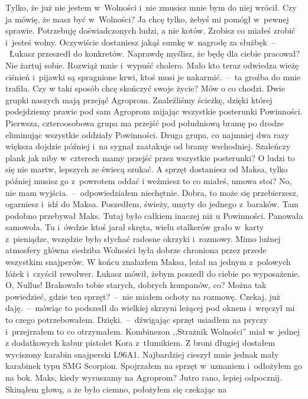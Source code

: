 \documentclass[../MAIN.tex]{subfiles}
\begin{document}
\xx Tylko, że już nie jestem w~Wolności i~nie zmusisz mnie bym
do
niej wrócił.
\xx Czy ja mówię, że masz być w~Wolności? Ja chcę tylko, żebyś
mi
pomógł w~pewnej sprawie. Potrzebuję doświadczonych ludzi, a nie
kotów. Zrobisz co miałeś zrobić i~jesteś wolny. Oczywiście
dostaniesz jakąś sumkę w~nagrodę za służbę\3k~--~Łukasz
przeszedł
do konkretów.
\xx Naprawdę myślisz, że będę dla ciebie pracował? Nie żartuj
sobie. Rozwiąż mnie i~wypuść cholero.
\xx Mało kto teraz odwiedza wieżę ciśnień i~pijawki są
spragnione
krwi, ktoś musi je nakarmić.~--~ta groźba do mnie trafiła. Czy
w
taki sposób chcę skończyć swoje życie?
\xx Mów o co chodzi.
\xx Dwie grupki naszych mają przejąć Agroprom. Znaleźliśmy
ścieżkę, dzięki której podejdziemy prawie pod sam Agroprom
mijając wszystkie posterunki Powinności. Pierwsza,
czteroosobowa grupa ma przejść pod południową bramę po drodze
eliminując wszystkie oddziały Powinności. Druga grupa, co
najmniej dwa razy większa dojdzie później i~na sygnał zaatakuje
od bramy wschodniej.
\xx Szaleńczy plan\3k jak niby w~czterech mamy przejść przez
wszystkie posterunki?
\xx O ludzi to się nie martw, lepszych ze świecą szukać. A
sprzęt
dostaniesz od Maksa, tylko później musisz go z~powrotem oddać i
weźmiesz to co miałeś, umowa stoi?
\xx No, nie mam wyjścia.~--~odpowiedziałem niechętnie.
\xx Dobra, to może się przebierzesz, ogarniesz i~idź do Maksa.
\qd
Poszedłem, świeży, umyty do jednego z~baraków. Tam podobno
przebywał Maks. Tutaj było całkiem inaczej niż u Powinności.
Panowała samowola. Tu i~ówdzie ktoś jarał skręta, wielu
stalkerów grało w~karty z~pieniądze, wszędzie było słychać
radosne okrzyki i~rozmowy. Mimo luźnej atmosfery główna
siedziba Wolności była dobrze chroniona przez przede wszystkim
snajperów. W końcu znalazłem Maksa, leżał na jednym z~polowych
łóżek i~czyścił rewolwer.
\sd
\xx Łukasz mówił, żebym poszedł do ciebie po wyposażenie.
\xx O, Nullus! Brakowało tobie starych, dobrych kompanów, co?
\xx Można tak powiedzieć, gdzie ten sprzęt?~--~nie miałem
ochoty na
rozmowę.
\xx Czekaj, już daję.~--~mówiąc to podszedł do wielkiej skrzyni
leżącej pod oknem i~wręczył mi to czego potrzebowałem.
\xx Dzięki.~--~dźwigając sprzęt usiadłem na pryczy
i~przejrzałem to
co otrzymałem. Kombinezon ,,Strażnik Wolności'' miał w~jednej z
dodatkowych kabur pistolet Kora z~tłumikiem. Z broni długiej
dostałem wyciszony karabin snajperski L96A1. Najbardziej
cieszył mnie jednak mały karabinek typu SMG Scorpion.
Spojrzałem na sprzęt w~uznaniem i~odłożyłem go na bok.
\xx Maks, kiedy wyruszamy na Agroprom?
\xx Jutro rano, lepiej odpocznij.
Skinąłem głową, a że było ciemno, położyłem się czekając na
\end{document}

